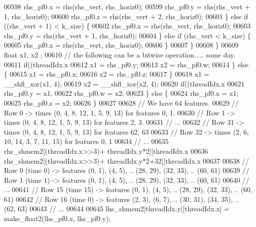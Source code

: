 \begin{DoxyCode}
00598           rhs\_pf0.x = rhs(rhs\_vert, rhs\_horiz0);
00599           rhs\_pf0.y = rhs(rhs\_vert + 1, rhs\_horiz0);
00600           rhs\_pf0.z = rhs(rhs\_vert + 2, rhs\_horiz0);
00601         \} \textcolor{keywordflow}{else} \textcolor{keywordflow}{if} ((rhs\_vert + 1) < k\_size) \{
00602           rhs\_pf0.x = rhs(rhs\_vert, rhs\_horiz0);
00603           rhs\_pf0.y = rhs(rhs\_vert + 1, rhs\_horiz0);
00604         \} \textcolor{keywordflow}{else} \textcolor{keywordflow}{if} (rhs\_vert  < k\_size) \{
00605           rhs\_pf0.x = rhs(rhs\_vert, rhs\_horiz0);
00606         \}
00607       \}
00608     \}
00609     \textcolor{keywordtype}{float} x1, x2 ;
00610     \textcolor{comment}{// the following can be a bitwise operation..... some day.}
00611     \textcolor{keywordflow}{if}((threadIdx.x%
00612       x1 = rhs\_pf0.y;
00613       x2 = rhs\_pf0.w;
00614     \} \textcolor{keywordflow}{else} \{
00615       x1 = rhs\_pf0.x;
00616       x2 = rhs\_pf0.z;
00617     \}
00618     x1 = \_\_shfl\_xor(x1, 4);
00619     x2 = \_\_shfl\_xor(x2, 4);
00620     \textcolor{keywordflow}{if}((threadIdx.x%
00621       rhs\_pf0.y = x1;
00622       rhs\_pf0.w = x2;
00623     \} \textcolor{keywordflow}{else} \{
00624       rhs\_pf0.x = x1;
00625       rhs\_pf0.z = x2;
00626     \}
00627 
00628     \textcolor{comment}{// We have 64 features.}
00629     \textcolor{comment}{// Row 0 -> times (0, 4, 8, 12, 1, 5, 9, 13) for features 0, 1.}
00630     \textcolor{comment}{// Row 1 -> times (0, 4, 8, 12, 1, 5, 9, 13) for features 2, 3.}
00631     \textcolor{comment}{// ...}
00632     \textcolor{comment}{// Row 31 -> times (0, 4, 8, 12, 1, 5, 9, 13) for features 62, 63}
00633     \textcolor{comment}{// Row 32 -> times (2, 6, 10, 14, 3, 7, 11, 15) for features 0, 1}
00634     \textcolor{comment}{// ...}
00635     rhs\_shmem2[(threadIdx.x>>3)+ threadIdx.y*2][threadIdx.x%
00636     rhs\_shmem2[(threadIdx.x>>3)+ threadIdx.y*2+32][threadIdx.x%
00637 
00638     \textcolor{comment}{// Row 0 (time 0) -> features (0, 1), (4, 5), .. (28, 29), (32, 33), ..  (60, 61)}
00639     \textcolor{comment}{// Row 1 (time 1) -> features (0, 1), (4, 5), .. (28, 29), (32, 33), ..  (60, 61)}
00640     \textcolor{comment}{// ...}
00641     \textcolor{comment}{// Row 15 (time 15) -> features (0, 1), (4, 5), .. (28, 29), (32, 33), ..  (60, 61)}
00642     \textcolor{comment}{// Row 16 (time 0) -> features (2, 3), (6, 7), .. (30, 31), (34, 35), ..  (62, 63)}
00643     \textcolor{comment}{// ...}
00644 
00645     lhs\_shmem2[threadIdx.y][threadIdx.x] = make\_float2(lhs\_pf0.x, lhs\_pf0.y);

\end{DoxyCode}
